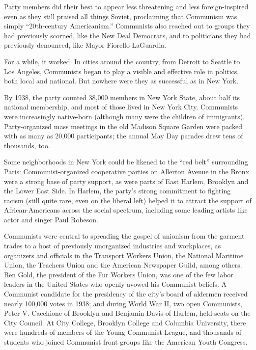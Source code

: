 Party members did their best to appear less threatening and less
foreign-inspired even as they still praised all things Soviet,
proclaiming that Communism was simply ``20th-century Americanism.''
Communists also reached out to groups they had previously scorned, like
the New Deal Democrats, and to politicians they had previously
denounced, like Mayor Fiorello LaGuardia.

For a while, it worked. In cities around the country, from Detroit to
Seattle to Los Angeles, Communists began to play a visible and effective
role in politics, both local and national. But nowhere were they as
successful as in New York.

By 1938, the party counted 38,000 members in New York State, about half
its national membership, and most of those lived in New York City.
Communists were increasingly native-born (although many were the
children of immigrants). Party-organized mass meetings in the old
Madison Square Garden were packed with as many as 20,000 participants;
the annual May Day parades drew tens of thousands, too.

Some neighborhoods in New York could be likened to the ``red belt''
surrounding Paris: Communist-organized cooperative parties on Allerton
Avenue in the Bronx were a strong base of party support, as were parts
of East Harlem, Brooklyn and the Lower East Side. In Harlem, the party's
strong commitment to fighting racism (still quite rare, even on the
liberal left) helped it to attract the support of African-Americans
across the social spectrum, including some leading artists like actor
and singer Paul Robeson.

Communists were central to spreading the gospel of unionism from the
garment trades to a host of previously unorganized industries and
workplaces, as organizers and officials in the Transport Workers Union,
the National Maritime Union, the Teachers Union and the American
Newspaper Guild, among others. Ben Gold, the president of the Fur
Workers Union, was one of the few labor leaders in the United States who
openly avowed his Communist beliefs. A Communist candidate for the
presidency of the city's board of aldermen received nearly 100,000 votes
in 1938; and during World War II, two open Communists, Peter V.
Cacchione of Brooklyn and Benjamin Davis of Harlem, held seats on the
City Council. At City College, Brooklyn College and Columbia University,
there were hundreds of members of the Young Communist League, and
thousands of students who joined Communist front groups like the
American Youth Congress.

